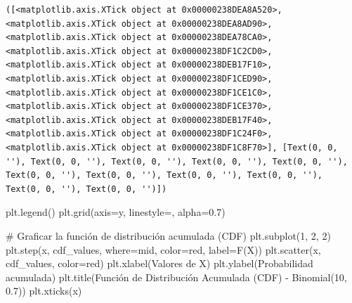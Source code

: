 \documentclass[
  letterpaper,
  DIV=11,
  numbers=noendperiod]{scrreprt}
\newenvironment{Shaded}{\begin{snugshade}}{\end{snugshade}}
\newcommand{\CommentTok}[1]{\textcolor[rgb]{0.37,0.37,0.37}{#1}}
\newcommand{\DecValTok}[1]{\textcolor[rgb]{0.68,0.00,0.00}{#1}}
\newcommand{\FloatTok}[1]{\textcolor[rgb]{0.68,0.00,0.00}{#1}}
\newcommand{\NormalTok}[1]{\textcolor[rgb]{0.00,0.23,0.31}{#1}}
\newcommand{\OperatorTok}[1]{\textcolor[rgb]{0.37,0.37,0.37}{#1}}
\newcommand{\StringTok}[1]{\textcolor[rgb]{0.13,0.47,0.30}{#1}}
\begin{document}
\begin{verbatim}
([<matplotlib.axis.XTick object at 0x00000238DEA8A520>, <matplotlib.axis.XTick object at 0x00000238DEA8AD90>, <matplotlib.axis.XTick object at 0x00000238DEA78CA0>, <matplotlib.axis.XTick object at 0x00000238DF1C2CD0>, <matplotlib.axis.XTick object at 0x00000238DEB17F10>, <matplotlib.axis.XTick object at 0x00000238DF1CED90>, <matplotlib.axis.XTick object at 0x00000238DF1CE1C0>, <matplotlib.axis.XTick object at 0x00000238DF1CE370>, <matplotlib.axis.XTick object at 0x00000238DEB17F40>, <matplotlib.axis.XTick object at 0x00000238DF1C24F0>, <matplotlib.axis.XTick object at 0x00000238DF1C8F70>], [Text(0, 0, ''), Text(0, 0, ''), Text(0, 0, ''), Text(0, 0, ''), Text(0, 0, ''), Text(0, 0, ''), Text(0, 0, ''), Text(0, 0, ''), Text(0, 0, ''), Text(0, 0, ''), Text(0, 0, '')])
\end{verbatim}

\begin{Shaded}
\begin{Highlighting}[]
\NormalTok{plt.legend()}
\NormalTok{plt.grid(axis}\OperatorTok{=}\StringTok{\textquotesingle{}y\textquotesingle{}}\NormalTok{, linestyle}\OperatorTok{=}\StringTok{\textquotesingle{}{-}{-}\textquotesingle{}}\NormalTok{, alpha}\OperatorTok{=}\FloatTok{0.7}\NormalTok{)}

\CommentTok{\# Graficar la función de distribución acumulada (CDF)}
\NormalTok{plt.subplot(}\DecValTok{1}\NormalTok{, }\DecValTok{2}\NormalTok{, }\DecValTok{2}\NormalTok{)}
\NormalTok{plt.step(x, cdf\_values, where}\OperatorTok{=}\StringTok{\textquotesingle{}mid\textquotesingle{}}\NormalTok{, color}\OperatorTok{=}\StringTok{\textquotesingle{}red\textquotesingle{}}\NormalTok{, label}\OperatorTok{=}\StringTok{\textquotesingle{}F(X)\textquotesingle{}}\NormalTok{)}
\NormalTok{plt.scatter(x, cdf\_values, color}\OperatorTok{=}\StringTok{\textquotesingle{}red\textquotesingle{}}\NormalTok{)}
\NormalTok{plt.xlabel(}\StringTok{\textquotesingle{}Valores de X\textquotesingle{}}\NormalTok{)}
\NormalTok{plt.ylabel(}\StringTok{\textquotesingle{}Probabilidad acumulada\textquotesingle{}}\NormalTok{)}
\NormalTok{plt.title(}\StringTok{\textquotesingle{}Función de Distribución Acumulada (CDF) {-} Binomial(10, 0.7)\textquotesingle{}}\NormalTok{)}
\NormalTok{plt.xticks(x)}
\end{Highlighting}
\end{Shaded}
\end{document}
